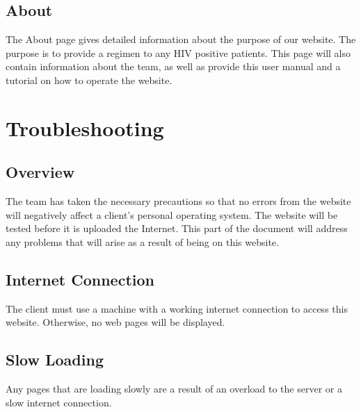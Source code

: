 \documentclass[12pt]{article}
\begin{document}
\subsection{About}
The About page gives detailed information about the purpose of our website. The purpose  is to provide a regimen to any HIV positive patients. This page will also contain information about the team, as well as provide this user manual and a tutorial on how to operate the website.

\section{Troubleshooting}
\subsection{Overview}
The team has taken the necessary precautions so that no errors from the website will negatively affect a client's personal operating system. The website will be tested before it is uploaded the Internet. This part of the document will address any problems that will arise as a result of being on this website.

\subsection{Internet Connection}
The client must use a machine with a working internet connection to access this website. Otherwise, no web pages will be displayed.

\subsection{Slow Loading}
Any pages that are loading slowly are a result of an overload to the server or a slow internet connection.
\end{document}
